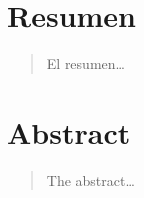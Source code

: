 \section*{Resumen}    

\begin{quotation}
El resumen\ldots
\end{quotation}

\section*{Abstract}

\begin{quotation}
The abstract\ldots
\end{quotation}


